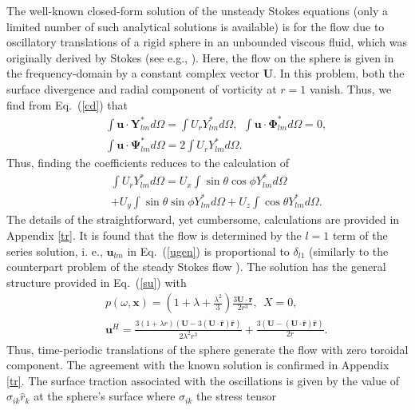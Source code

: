 \documentclass[aps,prx,twocolumn,amsmath,amssymb,amsfonts]{revtex4-2}
\begin{document}
{The well-known closed-form solution of the unsteady Stokes equations (only a limited number of such analytical solutions is available) is for the flow due to oscillatory translations of a rigid sphere in an unbounded viscous fluid, which was originally derived by Stokes (see e.g., \cite{kim}). Here, the flow on the sphere is given in the frequency-domain by a constant complex vector $\bm U$. In this problem, both the surface divergence and radial component of vorticity at $r\!=\!1$ vanish. Thus, we find from Eq.~(\ref{cd}) that
\begin{eqnarray}&&\!\!\!\!\!\!\!
\int \bm u\cdot \bm Y_{lm}^* d\Omega=\int  U_r Y_{lm}^* d\Omega,\ \ \int \bm u\cdot \bm \Phi_{lm}^* d\Omega=0,
\nonumber\\&&\!\!\!\!\!\!\!
\int \bm u\cdot \bm \Psi_{lm}^* d\Omega=
2\int  U_r Y_{lm}^* d\Omega.
\end{eqnarray}
Thus, finding the coefficients reduces to the calculation of
\begin{eqnarray}&&
\int  U_r Y_{lm}^* d\Omega=U_x\int \sin\theta\cos\phi Y_{lm}^* d\Omega
\nonumber\\&&
+U_y\int \sin\theta\sin\phi Y_{lm}^* d\Omega+U_z\int \cos\theta Y_{lm}^* d\Omega. \label{yc}
\end{eqnarray}
The details of the straightforward, yet cumbersome, calculations are provided in Appendix \ref{tr}. It is found that the flow is determined by the $l\!=\!1$ term of the series solution, i. e., $\bm u_{lm}$ in Eq.~(\ref{ugen}) is proportional to $\delta_{l1}$ (similarly to the counterpart problem of the steady Stokes flow \cite{kim}). The solution has the general structure provided in Eq.~(\ref{su}) with
\begin{eqnarray}&&
p(\omega, \bm x)\!=\!\left(1\!+\!\lambda\!+\!\frac{\lambda^2}{3}\right)\frac{3\bm U\!\cdot \!\bm r}{2r^3},\ \ X=0, \\&&
\bm u^H\!=\!\frac{3(1\!+\!\lambda r)\left(\bm U\!-\!3(\bm U\!\cdot\! \bm{\hat r})\bm{\hat r}\right)}{2\lambda^2 r^3}+
\frac{3\left(\bm U\!-\!(\bm U\!\cdot\! \bm{\hat r})\bm{\hat r}\right)}{2r}.\nonumber
\end{eqnarray}
Thus, time-periodic translations of the sphere generate the flow with zero toroidal component. The agreement with the known solution is confirmed in Appendix \ref{tr}. The surface traction associated with the oscillations is given by the value of $\sigma_{ik}{\hat r}_k$ at the sphere's surface where $\sigma_{ik}$ the stress tensor \cite{maxeyriley,kim}
\begin{eqnarray}&&\!\!\!\!\!\!\!\!\!\!\!\!\!

\end{eqnarray}}
\end{document}

